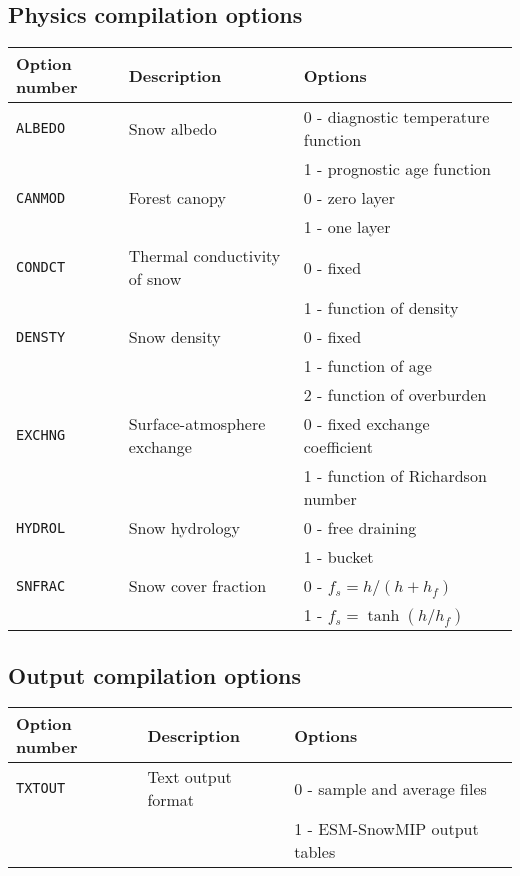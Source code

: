 \documentclass{article}
\begin{document}
\subsection{Physics compilation options }
\begin{longtable}{|l|l|l|}
\hline
Option number & Description & Options   \\
\hline
{\tt ALBEDO} & Snow albedo
&   0 - diagnostic temperature function \\
& & 1 - prognostic age function         \\
\hline
{\tt CANMOD} & Forest canopy
&   0 - zero layer                      \\
& & 1 - one layer                       \\
\hline
{\tt CONDCT} & Thermal conductivity of snow
&   0 - fixed                           \\
& & 1 - function of density             \\
\hline
{\tt DENSTY} & Snow density
&   0 - fixed                           \\
& & 1 - function of age                 \\
& & 2 - function of overburden          \\
\hline
{\tt EXCHNG} & Surface-atmosphere exchange
&   0 - fixed exchange coefficient      \\
& & 1 - function of Richardson number   \\
\hline
{\tt HYDROL} & Snow hydrology
&   0 - free draining                   \\
& & 1 - bucket                          \\ 
\hline
{\tt SNFRAC} & Snow cover fraction
&   0 - $f_s = h/(h+h_f)$               \\
& & 1 - $f_s = \tanh(h/h_f)$            \\ 
\hline
\end{longtable}

\subsection{Output compilation options }
\begin{longtable}{|l|l|l|}
\hline
Option number & Description & Options \\
\hline
{\tt TXTOUT} & Text output format
&   0 - sample and average files      \\
& & 1 - ESM-SnowMIP output tables     \\
\hline
\end{longtable}
\end{document}
